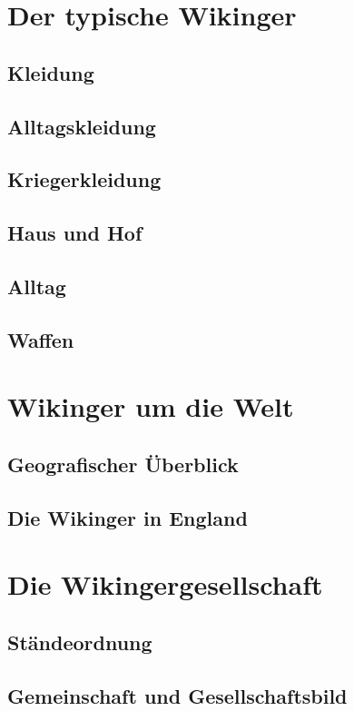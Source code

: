 \documentclass[12pt,a4paper,ngerman,openany]{book}
\newcommand{\fchapter}[1]{\chapter{#1}\thispagestyle{chapterstyle}}
\begin{document}
\fchapter{Der typische Wikinger}

\section{Kleidung}
\section{Alltagskleidung}

\section{Kriegerkleidung}

\section{Haus und Hof} %

\section{Alltag} %

\lipsum[6]

\section{Waffen}

\lipsum[1-2]

\fchapter{Wikinger um die Welt}

\section{Geografischer Überblick}

\section{Die Wikinger in England}

\lipsum[3]

\fchapter{Die Wikingergesellschaft}

\section{Ständeordnung}

\lipsum[6]

\section{Gemeinschaft und Gesellschaftsbild}
\end{document}
